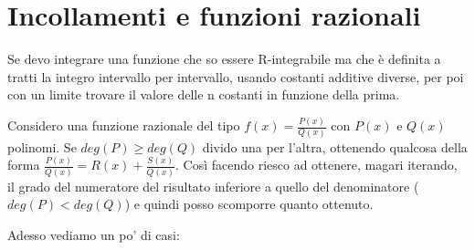 \documentclass{article}
\theoremstyle{definition}
\theoremstyle{definition}
\theoremstyle{definition}
\theoremstyle{definition}
\theoremstyle{definition}
\theoremstyle{definition}
\begin{document}
\newpage
\section{Incollamenti e funzioni razionali}

Se devo integrare una funzione che so essere R-integrabile ma che è definita a tratti la integro intervallo per intervallo, usando costanti additive diverse, per poi con un limite trovare il valore delle n costanti in funzione della prima.

\vspace{3mm}

Considero una funzione razionale del tipo $\displaystyle{f(x)=\frac{P(x)}{Q(x)}}$ con $P(x)$ e $Q(x)$ polinomi. Se $deg(P)\geq deg(Q)$ divido una per l'altra, ottenendo qualcosa della forma $\displaystyle{\frac{P(x)}{Q(x)}=R(x)+\frac{S(x)}{Q(x)}}$. Così facendo riesco ad ottenere, magari iterando, il grado del numeratore del risultato inferiore a quello del denominatore ($deg(P)<deg(Q)$) e quindi posso scomporre quanto ottenuto.

\vspace{3mm}

Adesso vediamo un po' di casi:
\end{document}
